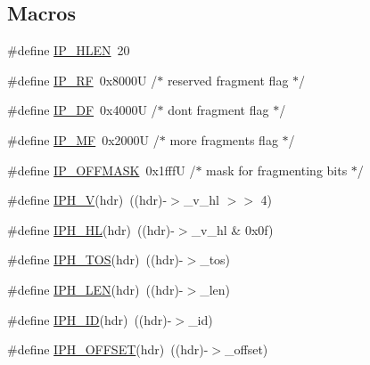\subsection*{Macros}
\begin{DoxyCompactItemize}
\item 
\#define \hyperlink{openmote-cc2538_2lwip_2src_2include_2lwip_2prot_2ip4_8h_ad76777d4d34f33ab5f715f9ca15503c3}{I\+P\+\_\+\+H\+L\+EN}~20
\item 
\#define \hyperlink{openmote-cc2538_2lwip_2src_2include_2lwip_2prot_2ip4_8h_a895709708f8f909cf7b7459491d549e7}{I\+P\+\_\+\+RF}~0x8000\+U        /$\ast$ reserved fragment flag $\ast$/
\item 
\#define \hyperlink{openmote-cc2538_2lwip_2src_2include_2lwip_2prot_2ip4_8h_ae2473f4a88d141d5298f92a4335b714a}{I\+P\+\_\+\+DF}~0x4000\+U        /$\ast$ don\textquotesingle{}t fragment flag $\ast$/
\item 
\#define \hyperlink{openmote-cc2538_2lwip_2src_2include_2lwip_2prot_2ip4_8h_ae8afe1e04bb9bad791443556c3b2cd73}{I\+P\+\_\+\+MF}~0x2000\+U        /$\ast$ more fragments flag $\ast$/
\item 
\#define \hyperlink{openmote-cc2538_2lwip_2src_2include_2lwip_2prot_2ip4_8h_ad059798b16d1f615b5af8770175121ba}{I\+P\+\_\+\+O\+F\+F\+M\+A\+SK}~0x1fff\+U   /$\ast$ mask for fragmenting bits $\ast$/
\item 
\#define \hyperlink{openmote-cc2538_2lwip_2src_2include_2lwip_2prot_2ip4_8h_a05a9e8ecf4eff38244b4c13c7e70094c}{I\+P\+H\+\_\+V}(hdr)~((hdr)-\/$>$\+\_\+v\+\_\+hl $>$$>$ 4)
\item 
\#define \hyperlink{openmote-cc2538_2lwip_2src_2include_2lwip_2prot_2ip4_8h_a7c60caeb708571a07a44309c10ec3a01}{I\+P\+H\+\_\+\+HL}(hdr)~((hdr)-\/$>$\+\_\+v\+\_\+hl \& 0x0f)
\item 
\#define \hyperlink{openmote-cc2538_2lwip_2src_2include_2lwip_2prot_2ip4_8h_a13fb5476ab97db9c5de6c1f5ca0d82e6}{I\+P\+H\+\_\+\+T\+OS}(hdr)~((hdr)-\/$>$\+\_\+tos)
\item 
\#define \hyperlink{openmote-cc2538_2lwip_2src_2include_2lwip_2prot_2ip4_8h_aec0328fe4711b8c1ef4dd6709e4fd6d5}{I\+P\+H\+\_\+\+L\+EN}(hdr)~((hdr)-\/$>$\+\_\+len)
\item 
\#define \hyperlink{openmote-cc2538_2lwip_2src_2include_2lwip_2prot_2ip4_8h_ae79eaecc0bf9e4dbb9e47ea56ad2157a}{I\+P\+H\+\_\+\+ID}(hdr)~((hdr)-\/$>$\+\_\+id)
\item 
\#define \hyperlink{openmote-cc2538_2lwip_2src_2include_2lwip_2prot_2ip4_8h_a559dce3878f1d6a46bcb4cb312962397}{I\+P\+H\+\_\+\+O\+F\+F\+S\+ET}(hdr)~((hdr)-\/$>$\+\_\+offset)
$$
\end{DoxyCompactItemize}
